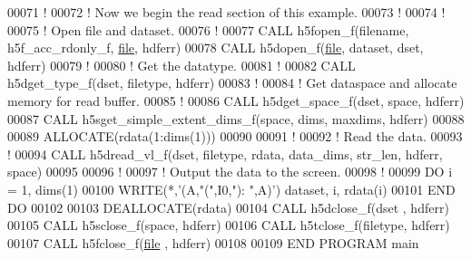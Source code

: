 \begin{DoxyCode}
00071   \textcolor{comment}{!}
00072   \textcolor{comment}{! Now we begin the read section of this example.}
00073   \textcolor{comment}{!}
00074   \textcolor{comment}{!}
00075   \textcolor{comment}{! Open file and dataset.}
00076   \textcolor{comment}{!}
00077   \textcolor{keyword}{CALL }h5fopen\_f(filename, h5f\_acc\_rdonly\_f, \hyperlink{structfile}{file}, hdferr)
00078   \textcolor{keyword}{CALL }h5dopen\_f(\hyperlink{structfile}{file}, dataset, dset, hdferr)
00079   \textcolor{comment}{!}
00080   \textcolor{comment}{! Get the datatype.}
00081   \textcolor{comment}{!}
00082   \textcolor{keyword}{CALL }h5dget\_type\_f(dset, filetype, hdferr)
00083   \textcolor{comment}{!}
00084   \textcolor{comment}{! Get dataspace and allocate memory for read buffer.}
00085   \textcolor{comment}{!}
00086   \textcolor{keyword}{CALL }h5dget\_space\_f(dset, space, hdferr)
00087   \textcolor{keyword}{CALL }h5sget\_simple\_extent\_dims\_f(space, dims, maxdims, hdferr)
00088 
00089   \textcolor{keyword}{ALLOCATE}(rdata(1:dims(1)))
00090 
00091   \textcolor{comment}{!}
00092   \textcolor{comment}{! Read the data.}
00093   \textcolor{comment}{!}
00094   \textcolor{keyword}{CALL }h5dread\_vl\_f(dset, filetype, rdata, data\_dims, str\_len, hdferr, space)
00095 
00096   \textcolor{comment}{!}
00097   \textcolor{comment}{! Output the data to the screen.}
00098   \textcolor{comment}{!}
00099   \textcolor{keywordflow}{DO} i = 1, dims(1)
00100      \textcolor{keyword}{WRITE}(*,\textcolor{stringliteral}{'(A,"(",I0,"): ",A)'}) dataset, i, rdata(i)
00101 \textcolor{keywordflow}{  END DO}
00102 
00103   \textcolor{keyword}{DEALLOCATE}(rdata)
00104   \textcolor{keyword}{CALL }h5dclose\_f(dset , hdferr)
00105   \textcolor{keyword}{CALL }h5sclose\_f(space, hdferr)
00106   \textcolor{keyword}{CALL }h5tclose\_f(filetype, hdferr)
00107   \textcolor{keyword}{CALL }h5fclose\_f(\hyperlink{structfile}{file} , hdferr)
00108 
00109 \textcolor{keyword}{END PROGRAM }main
\end{DoxyCode}
